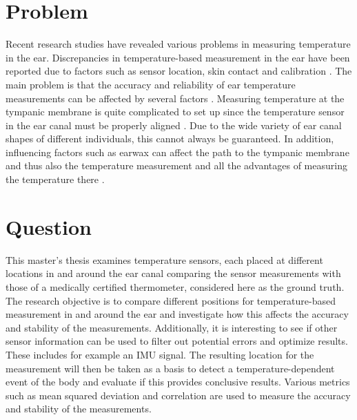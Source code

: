 \section{Problem}
\label{ch:Introduction:Problem}
Recent research studies have revealed various problems in measuring temperature in the ear.
Discrepancies in temperature-based measurement in the ear have been reported due to factors such as sensor location, skin contact and calibration \cite{rohrbergTemperatureMeasurementEar1997, gasimAccuracyTympanicTemperature2013, amoateng-adjepongAccuracyInfraredTympanic1999a, hookerScreeningFeverAdult1996a, cattaneoAccuracyPrecisionBody2000}.
The main problem is that the accuracy and reliability of ear temperature measurements can be affected by several factors \cite{gasimAccuracyTympanicTemperature2013}. 
Measuring temperature at the tympanic membrane is quite complicated to set up since the temperature sensor in the ear canal must be properly aligned \cite{amoateng-adjepongAccuracyInfraredTympanic1999a, gasimAccuracyTympanicTemperature2013}. 
Due to the wide variety of ear canal shapes of different individuals, this cannot always be guaranteed.
In addition, influencing factors such as earwax can affect the path to the tympanic membrane and thus also the temperature measurement and all the advantages of measuring the temperature there \cite{gasimAccuracyTympanicTemperature2013}.


\section{Question}
\label{ch:Introduction:Question}
This master's thesis examines temperature sensors, each placed at different locations in and around the ear canal comparing the sensor measurements with those of a medically certified thermometer, considered here as the ground truth.
The research objective is to compare different positions for temperature-based measurement in and around the ear and investigate how this affects the accuracy and stability of the measurements.
Additionally, it is interesting to see if other sensor information can be used to filter out potential errors and optimize results. These includes for example an IMU signal. 
The resulting location for the measurement will then be taken as a basis to detect a temperature-dependent event of the body and evaluate if this provides conclusive results.
Various metrics such as mean squared deviation and correlation are used to measure the accuracy and stability of the measurements.


